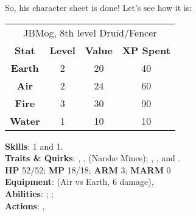 \begin{multimog}
So, his character sheet is done! Let's see how it is:
\begin{center}\label{tab:jbmog}
  \begin{tabular}{cccc}
    \toprule
    \multicolumn{4}{c}{JBMog, 8th level Druid/Fencer} \\
    \textbf{Stat}  & \textbf{Level} & \textbf{Value} & \textbf{XP Spent} \\ \midrule
    \textbf{Earth} & 2              & 20             & 40                \\
    \textbf{Air}   & 2              & 24             & 60                \\
    \textbf{Fire}  & 3              & 30             & 90                \\
    \textbf{Water} & 1              & 10             & 10                \\ \bottomrule
  \end{tabular}
\end{center}

\noindent \textbf{Skills}:  1 and  1.\\
\textbf{Traits \& Quirks}: , ,  (Narshe Mines); , , and .\\
\textbf{HP} 52/52; \textbf{MP} 18/18; \textbf{ARM} 3; \textbf{MARM} 0\\
\textbf{Equipment}:  (Air vs Earth, 6 damage), \\
\textbf{Abilities}: ; ; \\
\textbf{Actions}: , 
\end{multimog}